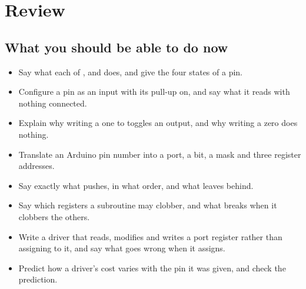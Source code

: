 
\section{Review}
\label{c2:sec:review}

\subsection*{What you should be able to do now}
\begin{itemize}
  \item Say what each of ,  and  does, and give the four states
    of a pin.
  \item Configure a pin as an input with its pull-up on, and say what it reads with nothing
    connected.
  \item Explain why writing a one to  toggles an output, and why writing a zero does
    nothing.
  \item Translate an Arduino pin number into a port, a bit, a mask and three register addresses.
  \item Say exactly what  pushes, in what order, and what  leaves behind.
  \item Say which registers a subroutine may clobber, and what breaks when it clobbers the others.
  \item Write a driver that reads, modifies and writes a port register rather than assigning to
    it, and say what goes wrong when it assigns.
  \item Predict how a driver's cost varies with the pin it was given, and check the prediction.
\end{itemize}

